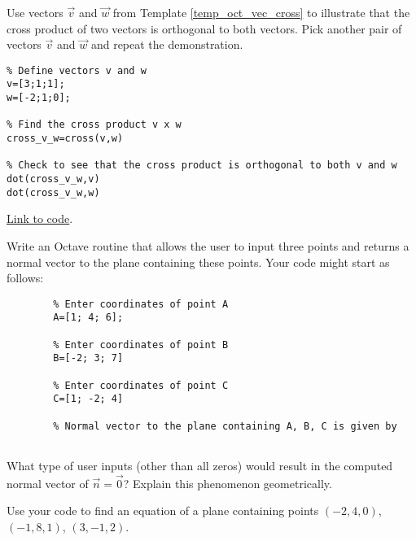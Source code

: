 \documentclass{ximera}
\begin{document}
\begin{problem}\label{prob_oct_vec_1}
    Use vectors $\vec{v}$ and $\vec{w}$ from Template \ref{temp_oct_vec_cross} to illustrate that the cross product of two vectors is orthogonal to both vectors.  Pick another pair of vectors $\vec{v}$ and $\vec{w}$ and repeat the demonstration.
    \begin{hint}
        \begin{verbatim}
% Define vectors v and w
v=[3;1;1];
w=[-2;1;0];

% Find the cross product v x w
cross_v_w=cross(v,w)

% Check to see that the cross product is orthogonal to both v and w
dot(cross_v_w,v)
dot(cross_v_w,w)
\end{verbatim}

\href{https://sagecell.sagemath.org/?z=eJxtjsEKwjAQRO-B_sNeCg1UsHoMOSn-RJES09UEpSvJmvj5phUUxNvMMG9na9jj2U8ICS1TiJDATCPkSiTdb1WnuqOqRNb9alPMejaVqOHgS4kdgg0UI9wDjQ_LBX7O6BIOach6UU1qs3xzO4f2CkwQEQtv-M8RH4ECO7rQZG5z90Tsvn-NxM1noE3yN8nyBT-BRHk=&lang=octave&interacts=eJyLjgUAARUAuQ==}{Link to code}.
    \end{hint}
\end{problem}

\begin{problem}\label{prob_oct_vec_4}
    Write an Octave routine that allows the user to input three points and returns a normal vector to the plane containing these points.  Your code might start as follows:

    \begin{verbatim}
        % Enter coordinates of point A
        A=[1; 4; 6];
        
        % Enter coordinates of point B
        B=[-2; 3; 7]
        
        % Enter coordinates of point C
        C=[1; -2; 4]
        
        % Normal vector to the plane containing A, B, C is given by
        
    \end{verbatim}

    What type of user inputs (other than all zeros) would result in the computed normal vector of $\vec{n}=\vec{0}$?  Explain this phenomenon geometrically.

    Use your code to find an equation of a plane containing points $(-2, 4, 0)$, $(-1, 8, 1)$, $(3, -1, 2)$.
\end{problem}    
\end{document}
